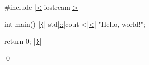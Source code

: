 
\begin{consolethree}[escapeinside=||]
#include |\underline{<}|iostream|\underline{>}|

int main()
|\underline{\texttt{\{}}|
    std|\underline{::}|cout <|\underline{<}| "Hello, world!\n";

    return 0;
|\underline{\texttt{\}}}|
\end{consolethree}
\qed
